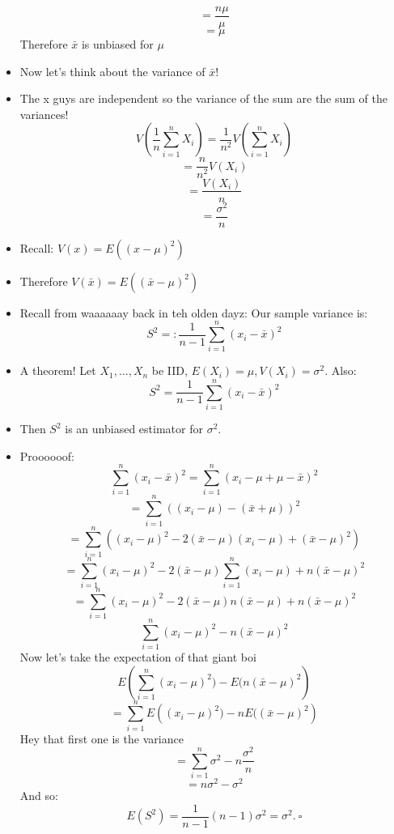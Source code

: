 \documentclass{article}
\begin{document}
\begin{itemize}
\[      \] 
      \[
        = \frac{n \mu}{\mu}
      \] 
      \[
        = \mu
      \] 
      Therefore $ \bar{x} $ is unbiased for $ \mu $
    \item Now let's think about the variance of $ \bar{x} $!
    \item The x guys are independent so the variance of the sum are the sum of the variances!
      \[
        V\left(\frac{1}{n} \sum_{i = 1}^{n} X_i\right) = \frac{1}{n^2} V\left( \sum_{i = 1}^{n} X_i \right)
      \] 
      \[
        = \frac{n}{n^2} V(X_i) 
      \] 
      \[
        = \frac{V(X_i)}{n}
      \] 
      \[
        = \frac{ \sigma^2}{n}
      \] 
    \item Recall: $ V(x) = E\left( {(x - \mu)}^2\right) $
    \item Therefore  $ V( \bar{x}) = E ( {(\bar{x} - \mu)}^2) $
    \item Recall from waaaaaay back in teh olden dayz: Our sample variance is:
      \[
        S^2 =: \frac{1}{n - 1} \sum_{i = 1}^{n} {(x_i - \bar{x})}^2
      \]  
    \item A theorem! Let $ X_1, \ldots, X_n $ be IID, $ E(X_i) = \mu, V(X_i) = \sigma^2 $. Also:
      \[
        S^2 = \frac{1}{n - 1} \sum_{i = 1}^{n} {(x_i - \bar{x})}^2 
      \]
    \item Then $ S^2 $ is an unbiased estimator for $ \sigma^2 $.
    \item Proooooof:
      \[
        \sum_{i = 1}^{n} {(x_i - \bar{x})}^2 = \sum_{i = 1}^{n}{(x_i - \mu + \mu - \bar{x})}^2
      \] 
      \[
        = \sum_{i = 1}^{n}{((x_i - \mu) - ( \bar{x} + \mu))}^2
      \] 
      \[
        = \sum_{i = 1}^{n}({(x_i - \mu)}^2 - 2( \bar{x} - \mu) (x_i - \mu) + {( \bar{x} - \mu)}^2)
      \] 
      \[
        = \sum_{i = 1}^{n}{(x_i - \mu)}^2 - 2 ( \bar{x} - \mu) \sum_{i = 1}^{n} (x_i - \mu) + n{( \bar{x} - \mu)}^2
      \] 
      \[
        = \sum_{i = 1}^{n} {(x_i - \mu)}^2 - 2 ( \bar{x} - \mu) n ( \bar{x} - \mu)  + n{( \bar{x} - \mu)}^2
      \] 
      \[
        \sum_{i = 1}^{n} {(x_i - \mu)}^2 - n {(\bar{x} - \mu)}^2
      \] 
      Now let's take the expectation of that giant boi 
      \[
        E\left(  \sum_{i = 1}^{n} {(x_i - \mu)}^2) - E (n {( \bar{x} - \mu)}^2\right)
      \] 
      \[
        = \sum_{i = 1}^{n} E\left({(x_i - \mu)}^2) - nE({( \bar{x} - \mu)}^2\right)
      \]
      Hey that first one is the variance
      \[
        = \sum_{i = 1}^{n} \sigma^2 - n \frac{\sigma^2}{n}
      \] 
      \[
        = n\sigma^2 - \sigma^2
      \] 
      And so:
      \[
        E(S^2) = \frac{1}{n - 1} (n - 1) \sigma^2 = \sigma^2.~\square
\]
\end{itemize}
\end{document}
